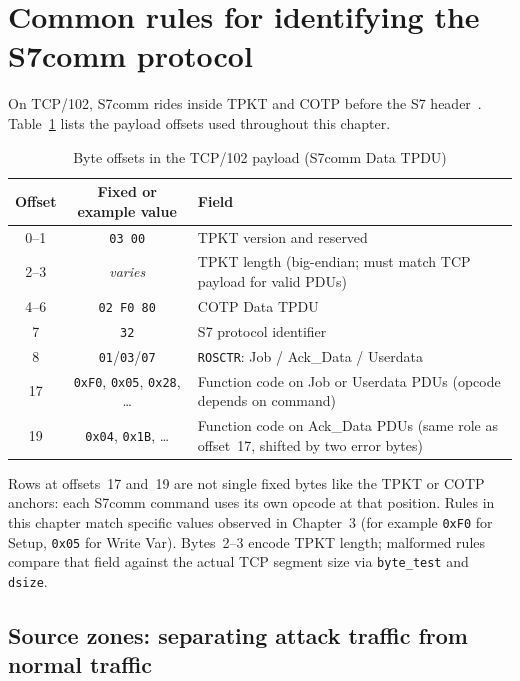 \documentclass[../main.tex]{subfiles}
\begin{document}
\section{Common rules for identifying the S7comm protocol}
\label{sec:rule-foundation}

On TCP/102, S7comm rides inside TPKT and COTP before the S7 header~\cite{rfc905,rfc1006,rfc2126,snap7_s7protocol}. Table~\ref{tab:s7-payload-offsets} lists the payload offsets used throughout this chapter.

\begin{table}[H]
    \centering
    \caption{Byte offsets in the TCP/102 payload (S7comm Data TPDU)}
    \label{tab:s7-payload-offsets}
    \begin{tabular}{|c|c|p{6.8cm}|}
        \hline
        \textbf{Offset} & \textbf{Fixed or example value} & \textbf{Field} \\
        \hline
        0--1 & \texttt{03 00} & TPKT version and reserved \\
        \hline
        2--3 & \emph{varies} & TPKT length (big-endian; must match TCP payload for valid PDUs) \\
        \hline
        4--6 & \texttt{02 F0 80} & COTP Data TPDU \\
        \hline
        7 & \texttt{32} & S7 protocol identifier \\
        \hline
        8 & \texttt{01}/\texttt{03}/\texttt{07} & \texttt{ROSCTR}: Job / Ack\_Data / Userdata \\
        \hline
        17 & \texttt{0xF0}, \texttt{0x05}, \texttt{0x28}, \ldots & Function code on Job or Userdata PDUs (opcode depends on command) \\
        \hline
        19 & \texttt{0x04}, \texttt{0x1B}, \ldots & Function code on Ack\_Data PDUs (same role as offset~17, shifted by two error bytes) \\
        \hline
    \end{tabular}
\end{table}

Rows at offsets~17 and~19 are not single fixed bytes like the TPKT or COTP anchors: each S7comm command uses its own opcode at that position. Rules in this chapter match specific values observed in Chapter~3 (for example \texttt{0xF0} for Setup, \texttt{0x05} for Write Var). Bytes~2--3 encode TPKT length; malformed rules compare that field against the actual TCP segment size via \texttt{byte\_test} and \texttt{dsize}.

\subsection{Source zones: separating attack traffic from normal traffic}
\label{sec:rule-source-zones}
\end{document}
